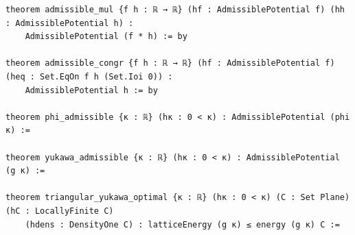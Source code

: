\begin{Verbatim}[fontsize=\scriptsize,frame=single,framesep=1.5mm]
theorem admissible_mul {f h : ℝ → ℝ} (hf : AdmissiblePotential f) (hh : AdmissiblePotential h) :
    AdmissiblePotential (f * h) := by

theorem admissible_congr {f h : ℝ → ℝ} (hf : AdmissiblePotential f) (heq : Set.EqOn f h (Set.Ioi 0)) :
    AdmissiblePotential h := by

theorem phi_admissible {κ : ℝ} (hκ : 0 < κ) : AdmissiblePotential (phi κ) :=

theorem yukawa_admissible {κ : ℝ} (hκ : 0 < κ) : AdmissiblePotential (g κ) :=

theorem triangular_yukawa_optimal {κ : ℝ} (hκ : 0 < κ) (C : Set Plane) (hC : LocallyFinite C)
    (hdens : DensityOne C) : latticeEnergy (g κ) ≤ energy (g κ) C :=
\end{Verbatim}
